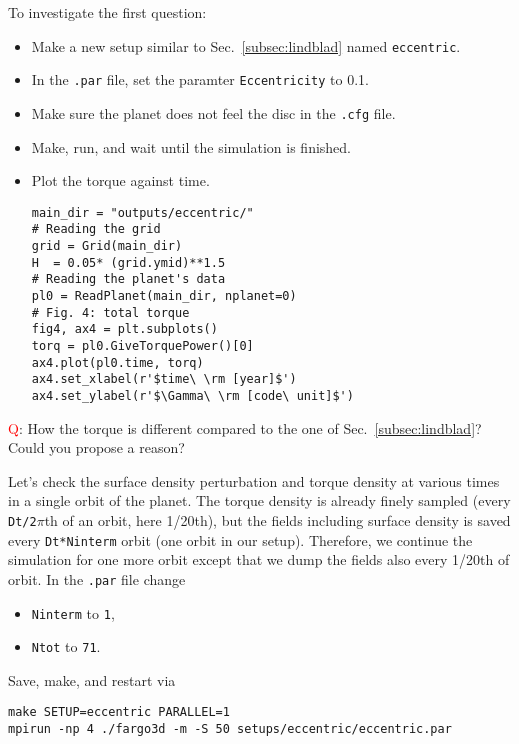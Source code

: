 \documentclass[14pt]{scrartcl}
\begin{document}
To investigate the first question:
\begin{itemize}
	\item Make a new setup similar to Sec.~\ref{subsec:lindblad} named \texttt{eccentric}.
	\item In the \texttt{.par} file, set the paramter \texttt{Eccentricity} to 0.1.
	\item Make sure the planet does not feel the disc in the \texttt{.cfg} file.
	\item Make, run, and wait until the simulation is finished.
	\item Plot the torque against time.
	\begin{verbatim}
main_dir = "outputs/eccentric/"
# Reading the grid
grid = Grid(main_dir)
H  = 0.05* (grid.ymid)**1.5
# Reading the planet's data
pl0 = ReadPlanet(main_dir, nplanet=0)
# Fig. 4: total torque
fig4, ax4 = plt.subplots()
torq = pl0.GiveTorquePower()[0]
ax4.plot(pl0.time, torq)
ax4.set_xlabel(r'$time\ \rm [year]$')
ax4.set_ylabel(r'$\Gamma\ \rm [code\ unit]$')
\end{verbatim}
\end{itemize} 
\textcolor{red}{Q}: How the torque is different compared to the one of Sec.~\ref{subsec:lindblad}? Could you propose a reason?

Let's check the surface density perturbation and torque density at various times in a single orbit of the planet. The torque density is already finely sampled (every \texttt{Dt/2$\pi$}th of an orbit, here 1/20th), but the fields including surface density is saved every \texttt{Dt*Ninterm} orbit (one orbit in our setup). Therefore, we continue the simulation for one more orbit except that we dump the fields also every 1/20th of orbit. In the \texttt{.par} file change
\begin{itemize}
	\item \texttt{Ninterm} to \texttt{1},
	\item \texttt{Ntot} to \texttt{71}.
\end{itemize} 
Save, make, and restart via 
\begin{verbatim}
make SETUP=eccentric PARALLEL=1
mpirun -np 4 ./fargo3d -m -S 50 setups/eccentric/eccentric.par
\end{verbatim}
\end{document}
